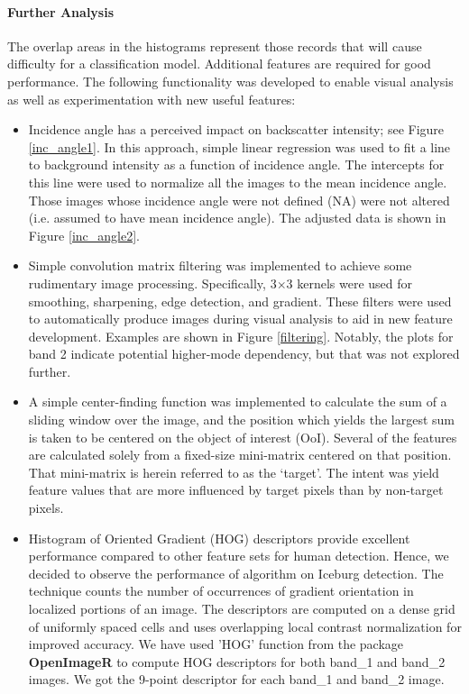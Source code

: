 \documentclass[fleqn,10pt]{SelfArx} %
\begin{document}
\paragraph{Further Analysis} The overlap areas in the histograms represent those records that will cause difficulty for a classification model. Additional features are required for good performance.  The following functionality was developed to enable visual analysis as well as experimentation with new useful features:

\begin{itemize}
	\item Incidence angle has a perceived impact on backscatter intensity; see Figure \ref{inc_angle1}.  In this approach, simple linear regression was used to fit a line to background intensity as a function of incidence angle.  The intercepts for this line were used to normalize all the images to the mean incidence angle.  Those images whose incidence angle were not defined (NA) were not altered (i.e. assumed to have mean incidence angle).  The adjusted data is shown in Figure \ref{inc_angle2}.
	
	\item Simple convolution matrix filtering was implemented to achieve some rudimentary image processing.  Specifically, 3$\times$3 kernels were used for smoothing, sharpening, edge detection, and gradient. \cite{polarimetric} These filters were used to automatically produce images during visual analysis to aid in new feature development.  Examples are shown in Figure \ref{filtering}.  Notably, the plots for band 2 indicate potential higher-mode dependency, but that was not explored further.
	
	\item A simple center-finding function was implemented to calculate the sum of a sliding window over the image, and the position which yields the largest sum is taken to be centered on the object of interest (OoI).  Several of the features are calculated solely from a fixed-size mini-matrix centered on that position.  That mini-matrix is herein referred to as the `target'.  The intent was yield feature values that are more influenced by target pixels than by non-target pixels.
	
	\item Histogram of Oriented Gradient (HOG) descriptors provide excellent performance compared to other feature sets for human detection\cite{hog}. Hence, we decided to observe the performance of algorithm on Iceburg detection. The technique counts the number of occurrences of gradient orientation in localized portions of an image. The descriptors are computed on a dense grid of uniformly spaced cells and uses overlapping local contrast normalization for improved accuracy. We have used 'HOG' function from the package \textbf{OpenImageR} to compute HOG descriptors for both band\_1 and band\_2 images. We got the 9-point descriptor for each band\_1 and band\_2 image.    
\end{itemize}
\end{document}
